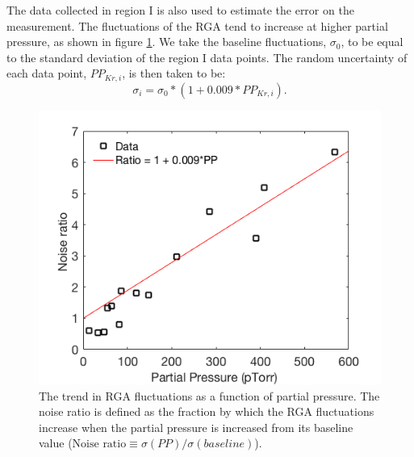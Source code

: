 \documentclass[12pt]{article}
\begin{document}
The data collected in region I is also used to estimate the error on the measurement. The fluctuations of the RGA tend to increase at higher partial pressure, as shown in figure \ref{fig:RGAnoise}. We take the baseline fluctuations, $\sigma_0$, to be equal to the standard deviation of the region I data points. The random uncertainty of each data point, $PP_{Kr,i}$, is then taken to be:
\begin{equation}
\sigma_i=\sigma_{0}*(1+0.009*PP_{Kr,i}).
\end{equation}


\begin{figure}[h!]
  \includegraphics[width=\linewidth]{Figures/RGA_Noise_v_PP.png}
  \caption{The trend in RGA fluctuations as a function of partial pressure. The noise ratio is defined as the fraction by which the RGA fluctuations increase when the partial pressure is increased from its baseline value ($\textrm{Noise ratio} \equiv \sigma(PP)/\sigma(baseline)$). }
  \label{fig:RGAnoise}
\end{figure}
\end{document}
